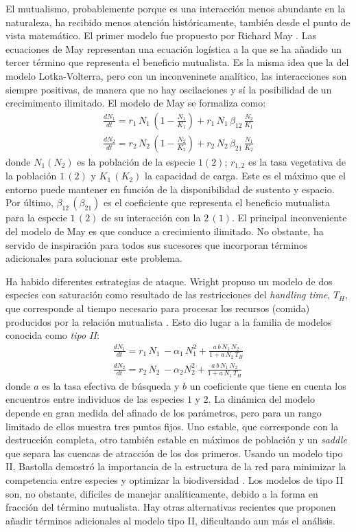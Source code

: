 El mutualismo, probablemente porque es una interacción menos abundante en la naturaleza, ha recibido menos atención históricamente, también desde el punto de vista matemático. El primer modelo fue propuesto por Richard May \cite{may1981models}. Las ecuaciones de May representan una ecuación logística a la que se ha añadido un tercer término que representa el beneficio mutualista. Es la misma idea que la del modelo Lotka-Volterra, pero con un inconveninete analítico, las interacciones son siempre positivas, de manera que no hay oscilaciones y sí la posibilidad de un crecimimento ilimitado. El modelo de May se formaliza como:
\begin{align}
\frac{dN_1}{dt}=r_1 \,N_1\,\left(1-\frac{N_1}{K_1}\right)+r_1\, N_1\,\beta_{12}\, \frac{N_2}{K_1} \nonumber \\ 
\frac{dN_2}{dt}=r_2\, N_2\, \left(1-\frac{N_2}{K_2}\right)+r_2\, N_2\, \beta_{21} \, \frac{N_1}{K_2} 
\label{myeq2}
\end{align}
\noindent donde $N_1(N_2)$ es la población de la especie $1(2)$; $r_{1,2}$ es la tasa vegetativa de la población $1\, (2)$ y $K_1\, (K_2)$ la capacidad de carga. Este es el máximo que el entorno puede mantener en función de la disponibilidad de sustento y espacio. Por último, $\beta_{12}\,(\beta_{21})$ es el coeficiente que representa el beneficio mutualista para la especie $1\,(2)$ de su interacción con la $2\,(1)$. El principal inconveniente del modelo de May es que conduce a crecimiento ilimitado. No obstante, ha servido de inspiración para todos sus sucesores que incorporan términos adicionales para solucionar este problema.

Ha habido diferentes estrategias de ataque. Wright propuso un modelo de dos especies con saturación como resultado de las restricciones del \textit{handling time}, $T_H$, que corresponde al tiempo necesario para procesar los recursos (comida) producidos por la relación mutualista \cite{wright1989}. Esto dio lugar a la familia de modelos conocida como \textit{tipo II}:
\begin{align}
\frac{dN_1}{dt}=r_1\, N_1\, - \alpha_1 \, N_1^2+ \frac{a\, b\, N_1\,N_2}{1+ a\, N_2\,T_H} \nonumber\\
\frac{dN_2}{dt}=r_2\, N_2\, - \alpha_2 N_2^2 + \frac{a\,b\,N_1\,N_2}{1+a\, N_1\, T_H}
\label{eq_typeII}
\end{align}
\noindent donde $a$ es la tasa efectiva de búsqueda y $b$ un coeficiente que tiene en cuenta los encuentros entre individuos de las especies $1$ y $2$. La dinámica del modelo depende en gran medida del afinado de los parámetros, pero para un rango limitado de ellos muestra tres puntos fijos. Uno estable, que corresponde con la destrucción completa, otro también estable en máximos de población y un \textit{saddle} que separa las cuencas de atracción de los dos primeros. Usando un modelo tipo II, Bastolla demostró la importancia de la estructura de la red para minimizar la competencia entre especies y optimizar la biodiversidad \cite{bastolla2005,bastolla2009}. Los modelos de tipo II son, no obstante, difíciles de manejar analíticamente, debido a la forma en fracción del término mutualista. Hay otras alternativas recientes \cite{johnson2013} que proponen añadir términos adicionales al modelo tipo II, dificultando aun más el análisis.


